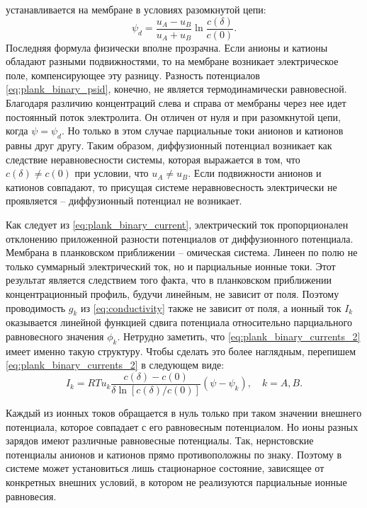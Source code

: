 устанавливается на мембране в условиях разомкнутой цепи:
\begin{equation}
    \psi_d = \frac{u_A - u_B}{u_A + u_B}\ln\frac{c(\delta)}{c(0)}.
    \label{eq:plank_binary_psid}
\end{equation}
Последняя формула физически вполне прозрачна. Если анионы и катионы обладают
разными подвижностями, то на мембране возникает электрическое поле,
компенсирующее эту разницу. Разность потенциалов \eqref{eq:plank_binary_psid},
конечно, не является термодинамически равновесной. Благодаря различию
концентраций слева и справа от мембраны через нее идет постоянный поток
электролита. Он отличен от нуля и при разомкнутой цепи, когда
\( \psi = \psi_d \). Но только в этом случае парциальные токи анионов и катионов
равны друг другу. Таким образом, диффузионный потенциал возникает как следствие
неравновесности системы, которая выражается в том, что \( c(\delta) \neq c(0) \)
при условии, что \( u_A \neq u_B \). Если подвижности анионов и катионов
совпадают, то присущая системе неравновесность электрически не проявляется --
диффузионный потенциал не возникает.

Как следует из \eqref{eq:plank_binary_current}, электрический ток
пропорционален отклонению приложенной разности потенциалов от диффузионного
потенциала. Мембрана в планковском приближении -- омическая система. Линеен по
полю не только суммарный электрический ток, но и парциальные ионные токи. Этот
результат является следствием того факта, что в планковском приближении
концентрационный профиль, будучи линейным, не зависит от поля. Поэтому
проводимость \(g_k\) из \eqref{eq:conductivity} также не зависит от поля, а
ионный ток \( I_k \) оказывается линейной функцией сдвига потенциала
относительно парциального равновесного значения \( \phi_k \). Нетрудно заметить,
что \eqref{eq:plank_binary_currents_2} имеет именно такую структуру. Чтобы
сделать это более наглядным, перепишем \eqref{eq:plank_binary_currents_2}
в следующем виде:
\begin{equation}
    I_k = RTu_k\frac{c(\delta) - c(0)}{\delta\ln[c(\delta)/c(0)]}(\psi-\psi_k),
    \quad k = A,B.
\end{equation}

Каждый из ионных токов обращается в нуль только при таком значении внешнего
потенциала, которое совпадает с его равновесным потенциалом. Но ионы разных
зарядов имеют различные равновесные потенциалы. Так, нернстовские потенциалы
анионов и катионов прямо противоположны по знаку. Поэтому в системе может
установиться лишь стационарное состояние, зависящее от конкретных внешних
условий, в котором не реализуются парциальные ионные равновесия.

